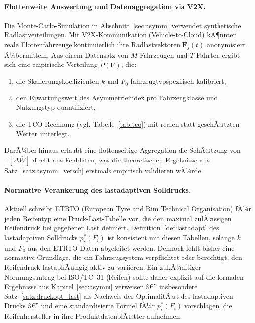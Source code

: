﻿\documentclass[a4paper,12pt]{article}
\theoremstyle{definition}
\begin{document}
\paragraph{Flottenweite Auswertung und Datenaggregation via V2X.}
Die Monte-Carlo-Simulation in Abschnitt~\ref{sec:asymm} verwendet
synthetische Radlastverteilungen. Mit V2X-Kommu\-nikation (Vehicle-to-Cloud)
kÃ¶nnten reale Flottenfahrzeuge kontinuierlich ihre Radlastvektoren
$\mathbf{F}_j(t)$ anonymisiert Ã¼bermitteln. Aus einem
Datensatz von $M$ Fahrzeugen und $T$ Fahrten ergibt sich eine
empirische Verteilung $\hat{P}(\mathbf{F})$, die:
\begin{enumerate}
    \item die Skalierungskoeffizienten $k$ und $F_0$ fahrzeugtypspezifisch
    kalibriert,
    \item den Erwartungswert des Asymmetrieindex pro Fahrzeugklasse und
    Nutzungstyp quantifiziert,
    \item die TCO-Rechnung (vgl. Tabelle~\ref{tab:tco}) mit realen
    statt geschÃ¤tzten Werten unterlegt.
\end{enumerate}
DarÃ¼ber hinaus erlaubt eine flottenseitige Aggregation die SchÃ¤tzung von
$\mathbb{E}[\Delta \overline{W}]$ direkt aus Felddaten, was die theoretischen
Ergebnisse aus Satz~\ref{satz:asymm_versch} erstmals empirisch validieren wÃ¼rde.

\paragraph{Normative Verankerung des lastadaptiven Solldrucks.}
Aktuell schreibt ETRTO (European Tyre and Rim Technical Organisation)
fÃ¼r jeden Reifentyp eine Druck-Last-Tabelle vor, die den maximal
zulÃ¤ssigen Reifendruck bei gegebener Last definiert. Definition~\ref{def:lastadapt}
des lastadaptiven Solldrucks $p^*_i(F_i)$ ist konsistent mit diesen
Tabellen, solange $k$ und $F_0$ aus den ETRTO-Daten abgeleitet werden.
Dennoch fehlt bisher eine normative Grundlage, die ein Fahrzeugsystem
verpflichtet oder berechtigt, den Reifendruck lastabhÃ¤ngig aktiv zu variieren.
Ein zukÃ¼nftiger Normungsantrag bei ISO/TC~31 (Reifen) sollte daher
explizit auf die formalen Ergebnisse aus Kapitel~\ref{sec:asymm} verweisen â€”
insbesondere Satz~\ref{satz:druckopt_last} als Nachweis der OptimalitÃ¤t
des lastadaptiven Drucks â€” und eine standardisierte Formel fÃ¼r $p^*_i(F_i)$
vorschlagen, die Reifenhersteller in ihre ProduktdatenblÃ¤tter aufnehmen.
\end{document}
